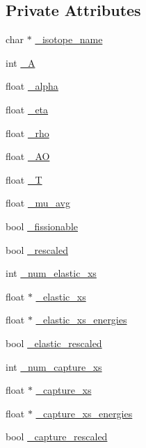 \subsection*{Private Attributes}
\begin{DoxyCompactItemize}
\item 
char $\ast$ \hyperlink{classIsotope_a073b0f7a2c59a676284d68dbdc588a6b}{\-\_\-isotope\-\_\-name}
\item 
int \hyperlink{classIsotope_a85a7058c3057f880e015791c460f7c29}{\-\_\-\-A}
\item 
float \hyperlink{classIsotope_af69f520a6f93928f245e075bc943cc75}{\-\_\-alpha}
\item 
float \hyperlink{classIsotope_a50668f89ec4d8218cab1339edab4c222}{\-\_\-eta}
\item 
float \hyperlink{classIsotope_a868ef4353a0481beb687a138b11646b2}{\-\_\-rho}
\item 
float \hyperlink{classIsotope_a73170c5a731744a3579daa7f12c72a16}{\-\_\-\-A\-O}
\item 
float \hyperlink{classIsotope_a6f0664722f1697f821f39e9a2dac0523}{\-\_\-\-T}
\item 
float \hyperlink{classIsotope_aa56de3d2e8a5ae51aec90e202abfac14}{\-\_\-mu\-\_\-avg}
\item 
bool \hyperlink{classIsotope_a4eaec9fe7e44e88193720dd6ef8d0eb1}{\-\_\-fissionable}
\item 
bool \hyperlink{classIsotope_a566f4289e1a7eaad70c02b63113040e5}{\-\_\-rescaled}
\item 
int \hyperlink{classIsotope_aeff29a44daea93ec2dfc06b39231afb7}{\-\_\-num\-\_\-elastic\-\_\-xs}
\item 
float $\ast$ \hyperlink{classIsotope_a32b731d4c4f2dc04bc460e5220f58609}{\-\_\-elastic\-\_\-xs}
\item 
float $\ast$ \hyperlink{classIsotope_aad8251fb7fd6d073f60653b0bdce0c07}{\-\_\-elastic\-\_\-xs\-\_\-energies}
\item 
bool \hyperlink{classIsotope_aebd68fdfbe5a0f7df2b5056d2fc902a3}{\-\_\-elastic\-\_\-rescaled}
\item 
int \hyperlink{classIsotope_ab4fb8d377328b23ae192dba57514ad40}{\-\_\-num\-\_\-capture\-\_\-xs}
\item 
float $\ast$ \hyperlink{classIsotope_a1d39f52d0c845a1c9d86b367aa987e6a}{\-\_\-capture\-\_\-xs}
\item 
float $\ast$ \hyperlink{classIsotope_a50e63730ff55e52239de9a4f0e3e865c}{\-\_\-capture\-\_\-xs\-\_\-energies}
\item 
bool \hyperlink{classIsotope_ac5443613ba3bc171c871055ac6098265}{\-\_\-capture\-\_\-rescaled}

\end{DoxyCompactItemize}
